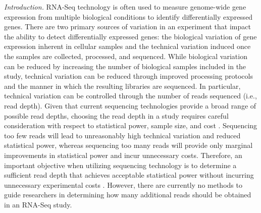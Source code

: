 \documentclass[11pt]{article}
\begin{document}
%

\noindent \textit{Introduction.} RNA-Seq technology is often used to measure genome-wide gene expression from multiple biological conditions to identify differentially expressed genes. There are two primary sources of variation in an experiment that impact the ability to detect differentially expressed genes: the biological variation of gene expression inherent in cellular samples and the technical variation induced once the samples are collected, processed, and sequenced. While biological variation can be reduced by increasing the number of biological samples included in the study, technical variation can be reduced through improved processing protocols and the manner in which the resulting libraries are sequenced. In particular, technical variation can be controlled through the number of reads sequenced (i.e., read depth). Given that current sequencing technologies provide a broad range of possible read depths, choosing the read depth in a study requires careful consideration with respect to statistical power, sample size, and cost \cite{Liu:2014br,Sims:2014ci}. Sequencing too few reads will lead to unreasonably high technical variation and reduced statistical power, whereas sequencing too many reads will provide only marginal improvements in statistical power and incur unnecessary costs. Therefore, an important objective when utilizing sequencing technology is to determine a sufficient read depth that achieves acceptable statistical power without incurring unnecessary experimental costs \cite{Tarazona:2011fi,Liu:2013hv}. However, there are currently no methods to guide researchers in determining how many additional reads should be obtained in an RNA-Seq study.
\end{document}

